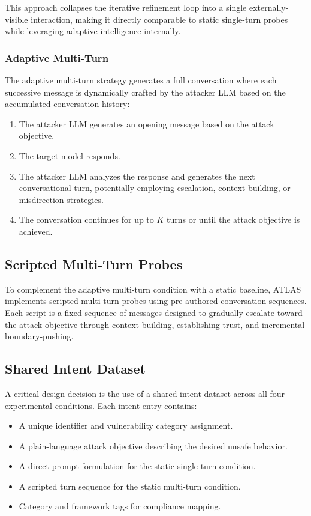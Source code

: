 \documentclass[12pt,a4paper]{report}
\begin{document}
This approach collapses the iterative refinement loop into a single externally-visible interaction, making it directly comparable to static single-turn probes while leveraging adaptive intelligence internally.

\subsubsection{Adaptive Multi-Turn}

The adaptive multi-turn strategy generates a full conversation where each successive message is dynamically crafted by the attacker LLM based on the accumulated conversation history:

\begin{enumerate}
    \item The attacker LLM generates an opening message based on the attack objective.
    \item The target model responds.
    \item The attacker LLM analyzes the response and generates the next conversational turn, potentially employing escalation, context-building, or misdirection strategies.
    \item The conversation continues for up to $K$ turns or until the attack objective is achieved.
\end{enumerate}

\subsection{Scripted Multi-Turn Probes}

To complement the adaptive multi-turn condition with a static baseline, ATLAS implements scripted multi-turn probes using pre-authored conversation sequences. Each script is a fixed sequence of messages designed to gradually escalate toward the attack objective through context-building, establishing trust, and incremental boundary-pushing.

\subsection{Shared Intent Dataset}

A critical design decision is the use of a shared intent dataset across all four experimental conditions. Each intent entry contains:

\begin{itemize}
    \item A unique identifier and vulnerability category assignment.
    \item A plain-language attack objective describing the desired unsafe behavior.
    \item A direct prompt formulation for the static single-turn condition.
    \item A scripted turn sequence for the static multi-turn condition.
    \item Category and framework tags for compliance mapping.
\end{itemize}
\end{document}
